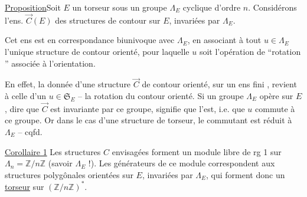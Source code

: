 
\uline{Proposition}\quad Soit $E$ un torseur sous un
groupe $\Lambda_E$  cyclique d'ordre $n$.  Considérons
l'ens. $\overrightarrow C(E)$ des structures de contour
 sur $E$, invariées par $\Lambda_E$.

  
Cet ens est en correspondance biunivoque
avec $\Lambda_E$, en associant à tout $u\in\Lambda_E$
l'unique structure de contour orienté, pour
laquelle $u$ soit l'opération de ``rotation '' associée à
l'orientation.

En effet, la donnée d'une structure $\overrightarrow C$
de contour orienté, sur un ens fini , revient
à celle d'un $u\in\mathfrak S_E$ -- la rotation  du contour orienté. Si un groupe
$\Lambda_E$ opère sur $E$, dire que $\overrightarrow C$ est invariante
par ce groupe, signifie que  l'est, i.e.
que $u$ commute à ce groupe. Or dans le
cas d'une structure de torseur, le
commutant est réduit à $\Lambda_E$ -- cqfd.

\uline{Corollaire 1} Les structures $C$ envisagées forment
un module libre de rg 1 sur $\Lambda_n=\mathbb Z/n\mathbb Z$
(savoir $\Lambda_E$ !). Les générateurs de ce
module correspondent aux structures
polygônales orientées sur $E$, invariées par $\Lambda_E$,
qui forment donc un \uline{torseur}  sur $(\mathbb Z/n\mathbb Z)^*$.

